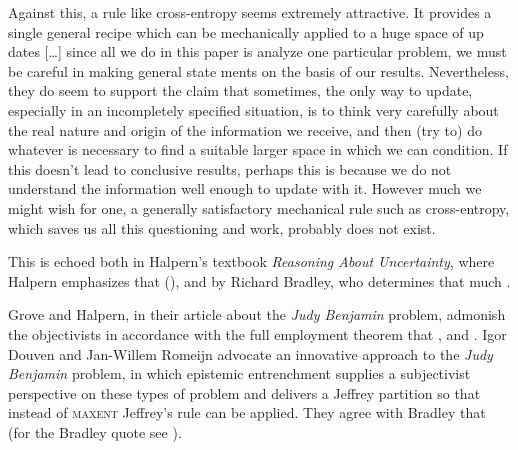 \documentclass[phd,12pt,oneside]{ubcthesis}
\begin{document}
\begin{quotex}
  Against this, a rule like cross-entropy seems extremely attractive.
  It provides a single general recipe which can be mechanically
  applied to a huge space of up dates [{\ldots}] since all we do in
  this paper is analyze one particular problem, we must be careful in
  making general state ments on the basis of our results.
  Nevertheless, they do seem to support the claim that sometimes, the
  only  way to update, especially in an incompletely
  specified situation, is to think very carefully about the real
  nature and origin of the information we receive, and then (try to)
  do whatever is necessary to find a suitable larger space in which we
  can condition. If this doesn't lead to conclusive results, perhaps
  this is because we do not understand the information well enough to
  update with it. However much we might wish for one, a generally
  satisfactory mechanical rule such as cross-entropy, which saves us
  all this questioning and work, probably does not exist.
\end{quotex}

This is echoed both in Halpern's textbook \emph{Reasoning About
  Uncertainty}, where Halpern emphasizes that 
(), and by Richard Bradley, who determines
that much  .

Grove and Halpern, in their article about the \emph{Judy Benjamin}
problem, admonish the objectivists in accordance with the full
employment theorem that  ,
and 
. Igor Douven and Jan-Willem Romeijn
advocate an innovative approach to the \emph{Judy Benjamin} problem,
in which epistemic entrenchment supplies a subjectivist perspective on
these types of problem and delivers a Jeffrey partition so that
instead of \textsc{maxent} Jeffrey's rule can be applied. They agree
with Bradley that 
 (for the Bradley quote see
).
\end{document}
